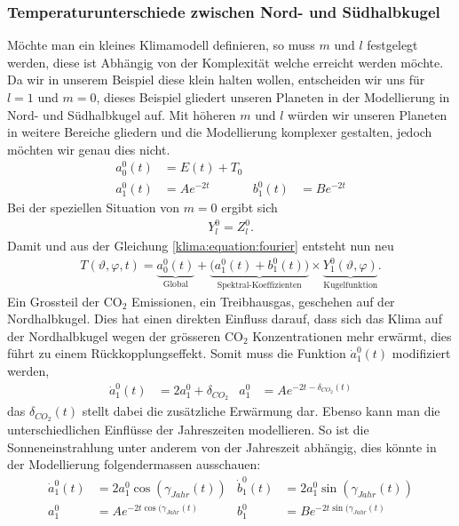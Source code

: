 \begin{refsection}
\subsubsection{Temperaturunterschiede zwischen Nord- und Südhalbkugel
\label{klima:subsubsection:halbkugel}}
Möchte man ein kleines Klimamodell definieren, so muss  $m$ und $l$ festgelegt werden, diese ist Abhängig von der Komplexität welche erreicht werden möchte. Da wir in unserem Beispiel diese klein halten wollen, entscheiden wir uns für $l=1$ und $m=0$, dieses Beispiel gliedert unseren Planeten in der Modellierung in Nord- und Südhalbkugel auf. Mit höheren $m$ und $l$ würden wir unseren Planeten in weitere Bereiche gliedern und die Modellierung komplexer gestalten, jedoch möchten wir genau dies nicht.
\begin{align*}
a^0_0(t)&=E(t)+T_0
\\
a^0_1(t) &=Ae^{-2t}&
b^0_1(t) &=Be^{-2t}
\end{align*}
Bei der speziellen Situation von $m=0$ ergibt sich
\begin{align*}
Y^0_l=Z^0_l.
\end{align*}
Damit und aus der Gleichung \eqref{klima:equation:fourier} entsteht nun neu
\begin{align}
T(\vartheta ,\varphi ,t)
=
\underbrace{a^0_0(t)}_{\text{Global}} + \underbrace{\bigl( a^0_1(t)+b^0_1(t) \bigr)}_{\text{Spektral-Koeffizienten}} \times \underbrace{Y^0_1(\vartheta ,\varphi)}_{\text{Kugelfunktion}}.
\end{align}
Ein Grossteil der CO$_2$ Emissionen, ein Treibhausgas, geschehen auf der Nordhalbkugel. Dies hat einen direkten Einfluss darauf, dass sich das Klima auf der Nordhalbkugel wegen der grösseren CO$_2$ Konzentrationen mehr erwärmt, dies führt zu einem Rückkopplungseffekt. Somit muss die Funktion $\dot a^0_1(t)$ modifiziert werden,
\begin{align*}
\dot a^0_1(t) &= 2a_1^0+\delta_{CO_2} &
a_1^0 &= Ae^{-2t-\delta_{CO_2}(t)}
\end{align*}
das $\delta_{CO_2}(t)$ stellt dabei die zusätzliche Erwärmung dar. Ebenso kann man die unterschiedlichen Einflüsse der Jahreszeiten modellieren. So ist die Sonneneinstrahlung unter anderem von der Jahreszeit abhängig, dies könnte in der Modellierung folgendermassen ausschauen:
\begin{align*}
\dot a_1^0(t) &= 2a_1^0 \cos(\gamma_{Jahr}(t)) &
\dot b_1^0(t) &= 2a_1^0 \sin(\gamma_{Jahr}(t))
\\
a_1^0 &= Ae^{-2t \cos(\gamma_{Jahr}(t)} &
b_1^0 &= Be^{-2t \sin(\gamma_{Jahr}(t)}
\end{align*}



\end{refsection}
